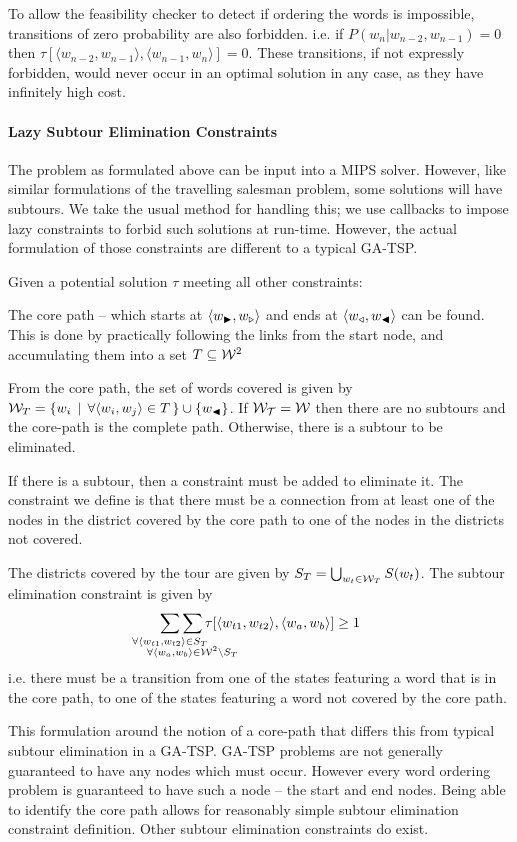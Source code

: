 \documentclass[twocolumn]{article}
\begin{document}
To allow the feasibility checker to detect if ordering the words is
impossible, transitions of zero probability are also forbidden. i.e. if \mbox{$P(w_{n}|w_{n-2},w_{n-1})=0$} then \mbox{$\tau[\langle w_{n-2},w_{n-1}\rangle,\langle w_{n-1},w_{n}\rangle]=0$}.
These transitions, if not expressly forbidden, would never occur in
an optimal solution in any case, as they have infinitely high cost.


\paragraph{Lazy Subtour Elimination Constraints}

The problem as formulated above can be input into a MIPS solver. However, like similar formulations of the
travelling salesman problem, some solutions will have subtours.
We take the usual method for handling this; we use callbacks to impose
lazy constraints to forbid such solutions at run-time.  
However, the actual formulation of those constraints are different to a typical GA-TSP.

Given a potential solution $\tau$ meeting all other constraints:

The core path -- which starts at $\langle w_{\blacktriangleright},w_{\triangleright}\rangle$
and ends at $\langle w_{\triangleleft},w_{\blacktriangleleft}\rangle$ can be found. This is done
by practically following the links from the start node, and accumulating
them into a set $T\subseteq\mathcal{W}^{2}$

From the core path, the set of words covered is given by $\mathcal{W}_{T}=\{w_{i}\,\mid\,\forall\langle w_{i},w_{j}\rangle\in T\,\}\cup\{w_{\blacktriangleleft}\}$.
If $\mathcal{W_{T}}=\mathcal{W}$ then there are no subtours and the core-path
is the complete path. Otherwise, there is a subtour to be eliminated.

If there is a subtour, then a constraint must be
added to eliminate it. The constraint we define is that there must be a connection from at least one of the nodes in the district covered by the core path to
one of the nodes in the districts not covered.

The districts covered by the tour are given by $S_{T}=\bigcup_{w_{t}\in \mathcal{W}_{T}}S(w_{t})$. The subtour elimination constraint is given by 
\displayunskip
\begin{equation*}
  \sum_{\mathclap{\forall\langle w_{t1},w_{t2}\rangle\in S_{T}}}
  \sum_{\mathclap{\substack{\; \\ \;\\ \forall\langle w_{a},w_{b}\rangle\in\W^{2}\backslash S_{T}}}}
  \tau[\langle w_{t1},w_{t2}\rangle,\langle w_{a},w_{b}\rangle]\ge1
\end{equation*}
i.e. there must be a transition from one of the states featuring a
word that is in the core path, to one of the states featuring a word
not covered by the core path.


This formulation around the notion of a core-path that differs this from typical subtour elimination in a GA-TSP. GA-TSP problems are not generally guaranteed to have any nodes which must occur. However every word ordering problem is guaranteed to have such a node -- the start and end nodes. Being able to identify the core path allows for reasonably simple subtour elimination constraint definition. Other subtour elimination constraints do exist.
\end{document}
